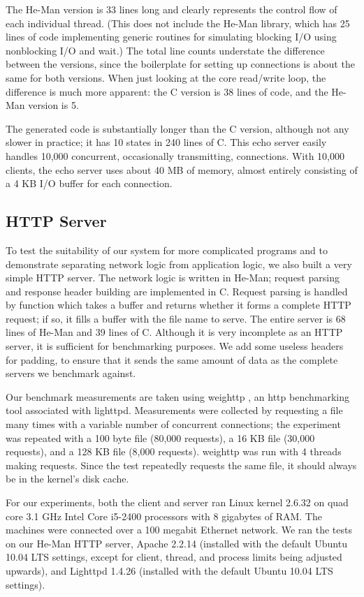 \documentclass[preprint]{sigplanconf}
\begin{document}
The He-Man version is 33 lines long and clearly represents the control flow of
each individual thread. (This does not include the He-Man library, which has 25
lines of code implementing generic routines for simulating blocking I/O using
nonblocking I/O and wait.) The total line counts understate the
difference between the versions, since the boilerplate for setting up
connections is about the same for both versions. When just looking at the core
read/write loop, the difference is much more apparent: the C version is 38 lines
of code, and the He-Man version is 5.

The generated code is substantially longer than the C version, although not any
slower in practice; it has 10 states in 240 lines of C. This echo server easily
handles 10,000 concurrent, occasionally transmitting, connections.  With 10,000
clients, the echo server uses about 40 MB of memory, almost entirely consisting
of a 4 KB I/O buffer for each connection.

\subsection{HTTP Server}

To test the suitability of our system for more complicated programs and to
demonstrate separating network logic from application logic, we also built a
very simple HTTP server. The network logic is written in He-Man; request parsing
and response header building are implemented in C. Request parsing is handled by
function which takes a buffer and returns whether it forms a complete HTTP
request; if so, it fills a buffer with the file name to serve. The entire server
is 68 lines of He-Man and 39 lines of C. Although it is very incomplete as an
HTTP server, it is sufficient for benchmarking purposes. We add some useless
headers for padding, to ensure that it sends the same amount of data as the
complete servers we benchmark against.

Our benchmark measurements are taken using weighttp \cite{weighttp}, an http
benchmarking tool associated with lighttpd.  Measurements were collected by
requesting a file many times with a variable number of concurrent connections;
the experiment was repeated with a 100 byte file (80,000 requests), a 16 KB file
(30,000 requests), and a 128 KB file (8,000 requests). weighttp was run with 4
threads making requests. Since the test repeatedly requests the same file, it
should always be in the kernel's disk cache.

For our experiments, both the client and server ran Linux kernel 2.6.32 on quad
core 3.1 GHz Intel Core i5-2400 processors with 8 gigabytes of RAM. The machines
were connected over a 100 megabit Ethernet network. We ran the tests on our
He-Man HTTP server, Apache 2.2.14 (installed with the default Ubuntu 10.04 LTS
settings, except for client, thread, and process limits being adjusted upwards),
and Lighttpd 1.4.26 (installed with the default Ubuntu 10.04 LTS settings).
\end{document}
